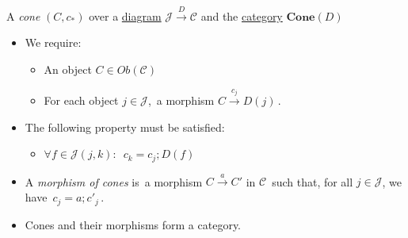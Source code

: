 A \emph{cone} $(C,c_*)$ over a \href{doc/1 math/Seven Sketches in Compositionality/Chapter 3: Databases/5 Introduction to limits and colimits/2 Limits/4 Cone}{diagram} $\mathcal{J}\xrightarrow{D}\mathcal{C}$ and the \href{doc/1 math/Seven Sketches in Compositionality/Chapter 3: Databases/2 Categories/1 Free Categories/1 Category}{category} $\mathbf{Cone}(D)$

\begin{itemize}
    \item  We require:
          \begin{itemize}
            \item An object $C \in Ob(\mathcal{C})$
            \item For each object $j \in \mathcal{J}$, \,a morphism $C \xrightarrow{c_j}D(j)$\,.
          \end{itemize}
    \item The following property must be satisfied:
          \begin{itemize}
            \item $\forall f \in \mathcal{J}(j,k):$ \,$c_k=c_j;D(f)$\,
          \end{itemize}
    \item A \emph{morphism of cones} is \,a morphism $C \xrightarrow{a} C'$ in $\mathcal{C}$\, such that, for all $j \in \mathcal{J}$, we have \,$c_j=a;c'_j$\,.
    \item Cones and their morphisms form a category.
  \end{itemize}
